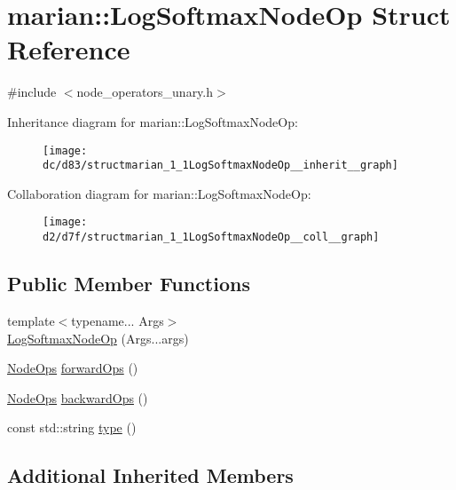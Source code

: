 \hypertarget{structmarian_1_1LogSoftmaxNodeOp}{}\section{marian\+:\+:Log\+Softmax\+Node\+Op Struct Reference}
\label{structmarian_1_1LogSoftmaxNodeOp}


{\ttfamily \#include $<$node\+\_\+operators\+\_\+unary.\+h$>$}



Inheritance diagram for marian\+:\+:Log\+Softmax\+Node\+Op\+:
\nopagebreak
\begin{figure}[H]
\begin{center}
\leavevmode
\texttt{[image: dc/d83/structmarian\_1\_1LogSoftmaxNodeOp\_\_inherit\_\_graph]}
\end{center}
\end{figure}


Collaboration diagram for marian\+:\+:Log\+Softmax\+Node\+Op\+:
\nopagebreak
\begin{figure}[H]
\begin{center}
\leavevmode
\texttt{[image: d2/d7f/structmarian\_1\_1LogSoftmaxNodeOp\_\_coll\_\_graph]}
\end{center}
\end{figure}
\subsection*{Public Member Functions}
\begin{DoxyCompactItemize}
\item 
{\footnotesize template$<$typename... Args$>$ }\\\hyperlink{structmarian_1_1LogSoftmaxNodeOp_a15be6dc8958a144ff3452ef951f5a430}{Log\+Softmax\+Node\+Op} (Args...\+args)
\item 
\hyperlink{namespacemarian_a4956376218cc236016c20bc4071470da}{Node\+Ops} \hyperlink{structmarian_1_1LogSoftmaxNodeOp_a37bbd793241ab857be6ca238383867f1}{forward\+Ops} ()
\item 
\hyperlink{namespacemarian_a4956376218cc236016c20bc4071470da}{Node\+Ops} \hyperlink{structmarian_1_1LogSoftmaxNodeOp_ab2ae88fe3ba607a32e566c6e0022c9f7}{backward\+Ops} ()
\item 
const std\+::string \hyperlink{structmarian_1_1LogSoftmaxNodeOp_a9be31a897d97bad9da23e8adbc3bbcf8}{type} ()
\end{DoxyCompactItemize}
\subsection*{Additional Inherited Members}


